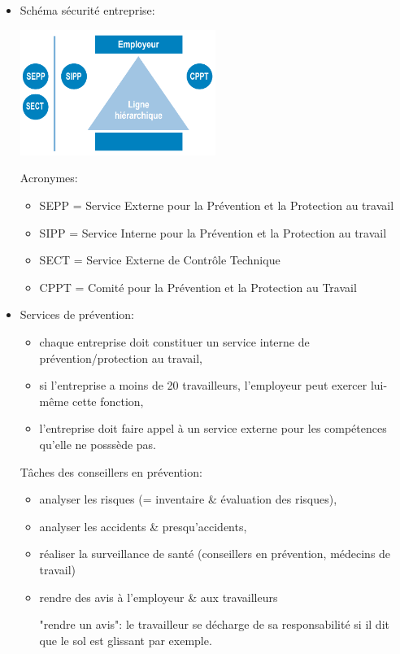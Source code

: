 \documentclass[a4paper]{article}
\begin{document}
\begin{itemize}
\item Schéma sécurité entreprise:
\begin{center}
\includegraphics[width=0.5\textwidth]{images/schema-entreprise.PNG}
\end{center}
Acronymes:
\begin{itemize}
    \item SEPP = Service Externe pour la Prévention et la Protection au travail
    \item SIPP = Service Interne pour la Prévention et la Protection au travail
    \item SECT = Service Externe de Contrôle Technique
    \item CPPT = Comité pour la Prévention et la Protection au Travail
\end{itemize}





\item Services de prévention:
\begin{itemize}
    \item chaque entreprise doit constituer un service interne de prévention/protection au travail,
    \item si l'entreprise a moins de 20 travailleurs, l'employeur peut exercer lui-même cette fonction,
    \item l’entreprise doit faire appel à un service externe pour les compétences qu'elle ne posssède pas.
\end{itemize}
Tâches des conseillers en prévention:
\begin{itemize}
    \item analyser les risques (= inventaire \& évaluation des risques),
    \item analyser les accidents \& presqu'accidents,
    \item réaliser la surveillance de santé (conseillers en prévention, médecins de travail)
    \item rendre des avis à l'employeur \& aux travailleurs
    \begin{example}
        "rendre un avis": le travailleur se décharge de sa responsabilité si il dit que le sol est glissant par exemple.
    \end{example}
\end{itemize}






\end{itemize}
\end{document}
